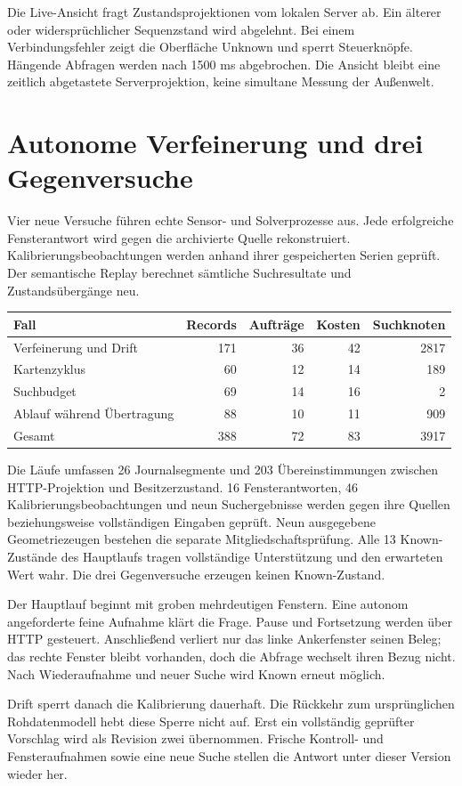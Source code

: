 \documentclass[11pt,a4paper]{article}
\newcommand{\nextsection}[2]{\clearpage{\color{accent}\small\textsf{#1}}\section{#2}}
\begin{document}
Die Live-Ansicht fragt Zustandsprojektionen vom lokalen Server
ab. Ein älterer oder widersprüchlicher Sequenzstand wird
abgelehnt. Bei einem Verbindungsfehler zeigt die Oberfläche
Unknown und sperrt Steuerknöpfe. Hängende Abfragen werden nach
1500 ms abgebrochen. Die Ansicht bleibt eine zeitlich abgetastete
Serverprojektion, keine simultane Messung der Außenwelt.

\nextsection{75 / PROZESSNACHWEISE}{Autonome Verfeinerung und drei Gegenversuche}
Vier neue Versuche führen echte Sensor- und Solverprozesse aus.
Jede erfolgreiche Fensterantwort wird gegen die archivierte
Quelle rekonstruiert. Kalibrierungsbeobachtungen werden anhand
ihrer gespeicherten Serien geprüft. Der semantische Replay
berechnet sämtliche Suchresultate und Zustandsübergänge neu.

\begin{tabularx}{\linewidth}{@{}Yrrrr@{}}\toprule
Fall & Records & Aufträge & Kosten & Suchknoten\\\midrule
Verfeinerung und Drift & 171 & 36 & 42 & 2817\\
Kartenzyklus & 60 & 12 & 14 & 189\\
Suchbudget & 69 & 14 & 16 & 2\\
Ablauf während Übertragung & 88 & 10 & 11 & 909\\\midrule
Gesamt & 388 & 72 & 83 & 3917\\\bottomrule
\end{tabularx}

Die Läufe umfassen 26 Journalsegmente und 203 Übereinstimmungen
zwischen HTTP-Projektion und Besitzerzustand. 16 Fensterantworten,
46 Kalibrierungsbeobachtungen und neun Suchergebnisse werden
gegen ihre Quellen beziehungsweise vollständigen Eingaben geprüft.
Neun ausgegebene Geometriezeugen bestehen die separate
Mitgliedschaftsprüfung. Alle 13 Known-Zustände des Hauptlaufs
tragen vollständige Unterstützung und den erwarteten Wert wahr.
Die drei Gegenversuche erzeugen keinen Known-Zustand.

Der Hauptlauf beginnt mit groben mehrdeutigen Fenstern. Eine
autonom angeforderte feine Aufnahme klärt die Frage. Pause und
Fortsetzung werden über HTTP gesteuert. Anschließend verliert
nur das linke Ankerfenster seinen Beleg; das rechte Fenster bleibt
vorhanden, doch die Abfrage wechselt ihren Bezug nicht. Nach
Wiederaufnahme und neuer Suche wird Known erneut möglich.

Drift sperrt danach die Kalibrierung dauerhaft. Die Rückkehr
zum ursprünglichen Rohdatenmodell hebt diese Sperre nicht auf.
Erst ein vollständig geprüfter Vorschlag wird als Revision zwei
übernommen. Frische Kontroll- und Fensteraufnahmen sowie eine
neue Suche stellen die Antwort unter dieser Version wieder her.
\end{document}
